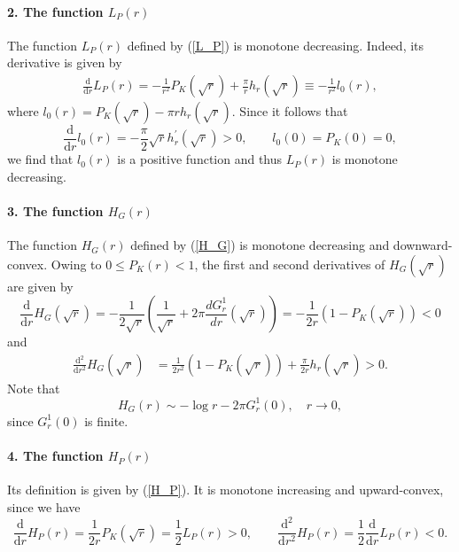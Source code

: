 \documentclass{article}
\theoremstyle{definition}
\begin{document}
\paragraph{2. The function $L_P(r)$} The function $L_P(r)$ defined by (\ref{L_P}) 
is  monotone decreasing. Indeed, its derivative is given by 
\begin{align*}
\frac{\mbox{d}}{\mbox{d}r} L_P(r) = - \frac{1}{r^2} P_K(\sqrt{r}) + \frac{\pi}{r} h_r(\sqrt{r}) \equiv - \frac{1}{r^2} l_0 (r), 
\end{align*}
where $l_0 (r) = P_K(\sqrt{r}) - \pi r h_r(\sqrt{r})$. Since it follows that
\begin{equation*}
\frac{\mbox{d}}{\mbox{d}r} l_0 (r) = - \frac{\pi}{2} \sqrt{r} h^\prime_r(\sqrt{r}) > 0, \qquad l_0 (0) = P_K(0) = 0, 
\end{equation*}
we find that $l_0(r)$ is a positive function and thus $L_P(r)$ is monotone decreasing.






\paragraph{3. The function $H_G(r)$} The function $H_G(r)$ defined by (\ref{H_G})
 is monotone decreasing and downward-convex. Owing to $0 \leq P_K(r) < 1$, the first and second derivatives of $H_G(\sqrt{r})$ are given by
\begin{equation*}
\frac{\mbox{d}}{\mbox{d}r} H_G(\sqrt{r})  = - \frac{1}{2 \sqrt{r}} \left( \frac{1}{\sqrt{r}} + 2 \pi \frac{dG_r^1}{dr}(\sqrt{r}) \right) = - \frac{1}{2 r} \left( 1 - P_K(\sqrt{r}) \right) < 0
\end{equation*}
and 
\begin{align*}
\frac{\mbox{d}^2}{\mbox{d}r^2} H_G(\sqrt{r}) & = \frac{1}{2 r^2} \left( 1 - P_K(\sqrt{r}) \right) + \frac{\pi}{2 r} h_r(\sqrt{r}) > 0.
\end{align*}
Note that
\begin{equation}
H_G(r) \sim - \log{r} - 2 \pi  G_r^1(0), \quad r \rightarrow 0, \label{H_G-zero}
\end{equation}
since $G_r^1(0)$ is finite.


\paragraph{4. The function $H_P(r)$} Its definition is given by (\ref{H_P}). It is monotone increasing and upward-convex, since we have
\begin{equation}
\frac{\mbox{d}}{\mbox{d}r} H_P(r) = \frac{1}{2 r} P_K(\sqrt{r}) = \frac{1}{2} L_P(r) > 0, \qquad \frac{\mbox{d}^2}{\mbox{d}r^2} H_P(r) = \frac{1}{2}\frac{\mbox{d}}{\mbox{d}r} L_P(r) < 0.
\label{Apdx_H_P}
\end{equation}
\end{document}
